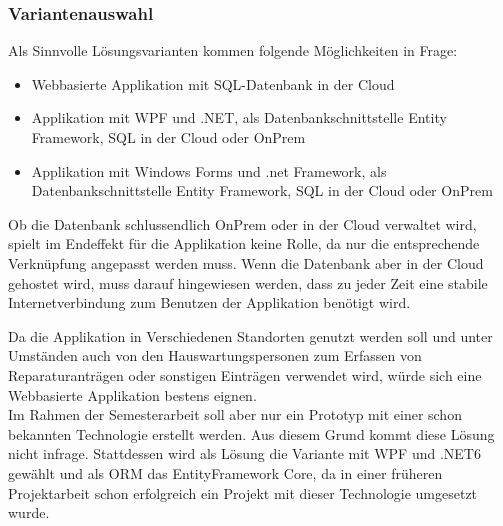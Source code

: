 \subsubsection{Variantenauswahl}
Als Sinnvolle Lösungsvarianten kommen folgende Möglichkeiten in Frage: 
\begin{itemize}
  \item Webbasierte Applikation mit SQL-Datenbank in der Cloud
  \item Applikation mit WPF und .NET, als Datenbankschnittstelle Entity Framework, SQL in der Cloud oder OnPrem
  \item Applikation mit Windows Forms und .net Framework, als Datenbankschnittstelle Entity Framework, SQL in der Cloud oder OnPrem
\end{itemize}
Ob die Datenbank schlussendlich OnPrem oder in der Cloud verwaltet wird, spielt im Endeffekt für die Applikation keine Rolle, da nur die entsprechende Verknüpfung angepasst werden muss. Wenn die Datenbank aber in der Cloud gehostet wird, muss darauf hingewiesen werden, dass zu jeder Zeit eine stabile Internetverbindung zum Benutzen der Applikation benötigt wird.\\
\vspace*{1mm}

Da die Applikation in Verschiedenen Standorten genutzt werden soll und unter Umständen auch von den Hauswartungspersonen zum Erfassen von Reparaturanträgen oder sonstigen Einträgen verwendet wird, würde sich eine Webbasierte Applikation bestens eignen.\\
Im Rahmen der Semesterarbeit soll aber nur ein Prototyp mit einer schon bekannten Technologie erstellt werden. Aus diesem Grund kommt diese Lösung nicht infrage. Stattdessen wird als Lösung die Variante mit WPF und .NET6 gewählt und als ORM das EntityFramework Core, da in einer früheren Projektarbeit schon erfolgreich ein Projekt mit dieser Technologie umgesetzt wurde.